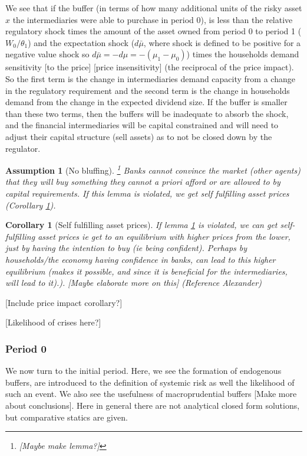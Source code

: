 \documentclass[11pt]{article}
\newtheorem{assumption}{Assumption}%
\newtheorem{corollary}{Corollary}
\begin{document}
We see that if the buffer (in terms of how many additional units of the risky asset $x$ the intermediaries were able to purchase in period 0), is less than the relative regulatory shock times the amount of the asset owned from period 0 to period 1 ($W_0/\theta_1$) and the expectation shock ($d\bar{\mu}$, where shock is defined to be positive for a negative value shock so $d\bar{\mu} = -d\mu = -(\mu_1-\mu_0)$) times the households demand sensitivity [to the price] [price insensitivity] (the reciprocal of the price impact). So the first term is the change in intermediaries demand capacity from a change in the regulatory requirement and the second term is the change in households demand from the change in the expected dividend size. If the buffer is smaller than these two terms, then the buffers will be inadequate to absorb the shock, and the financial intermediaries will be capital constrained and will need to adjust their capital structure (sell assets) as to not be closed down by the regulator.

\begin{assumption}[No bluffing] \label{l_noBluffing}
 \footnote{[Maybe make lemma?]} Banks cannot convince the market (other agents) that they will buy something they cannot a priori afford or are allowed to by capital requirements. If this lemma is violated, we get self fulfilling asset prices (Corollary \ref{c_selfFulfilling}).
\end{assumption}

\begin{corollary}[Self fulfilling asset prices] \label{c_selfFulfilling}
If lemma \ref{l_noBluffing} is violated, we can get self-fulfilling asset prices ie get to an equilibrium with higher prices from the lower, just by having the intention to buy (ie being confident). Perhaps by households/the economy having confidence in banks, can lead to this higher equilibrium (makes it possible, and since it is beneficial for the intermediaries, will lead to it).). [Maybe elaborate more on this] (Reference Alexander)
\end{corollary}

[Include price impact corollary?]

[Likelihood of crises here?]

\subsubsection*{Period 0}


We now turn to the initial period. Here, we see the formation of endogenous buffers, are introduced to the definition of systemic risk as well the likelihood of such an event. We also see the usefulness of macroprudential buffers [Make more about conclusions]. Here in general there are not analytical closed form solutions, but comparative statics are given.
\end{document}

